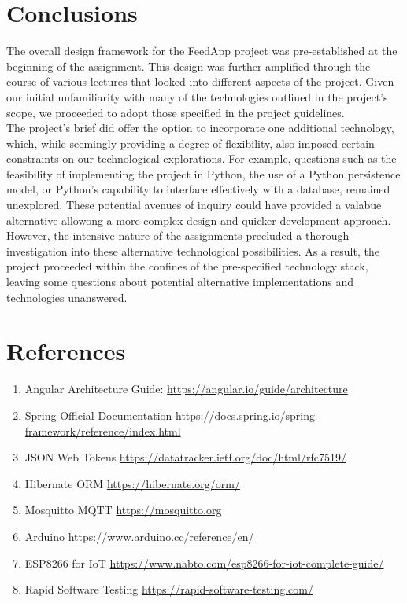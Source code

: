 \clearpage
\section{Conclusions}

\noindent The overall design framework for the FeedApp project was pre-established at the beginning of the assignment. This design was further amplified through the course of various lectures that looked into different aspects of the project.  Given our initial unfamiliarity with many of the technologies outlined in the project's scope, we proceeded to adopt those specified in the project guidelines.\\

\noindent The project's brief did offer the option to incorporate one additional technology, which, while seemingly providing a degree of flexibility, also imposed certain constraints on our technological explorations. For example, questions such as the feasibility of implementing the project in Python, the use of a Python persistence model, or Python's capability to interface effectively with a database, remained unexplored. These potential avenues of inquiry could have provided a valabue alternative allowong a more complex design and quicker development approach.\\

\noindent However, the intensive nature of the assignments precluded a thorough investigation into these alternative technological possibilities. As a result, the project proceeded within the confines of the pre-specified technology stack, leaving some questions about potential alternative implementations and technologies unanswered.

\section*{References}
\begin{enumerate}
  	\item Angular Architecture Guide: \url{https://angular.io/guide/architecture }
	\item Spring Official Documentation \url{https://docs.spring.io/spring-framework/reference/index.html}
          \item JSON Web Tokens  \url{https://datatracker.ietf.org/doc/html/rfc7519/}
 	\item Hibernate ORM \url{https://hibernate.org/orm/}
	\item Mosquitto MQTT \url{https://mosquitto.org}
	\item Arduino \url{https://www.arduino.cc/reference/en/}
  	\item ESP8266 for IoT \url{https://www.nabto.com/esp8266-for-iot-complete-guide/}
	\item Rapid Software Testing  \url{https://rapid-software-testing.com/}
\end{enumerate}